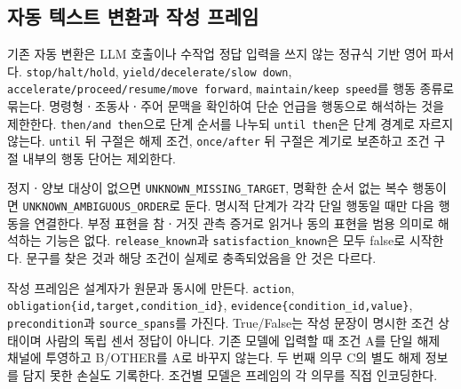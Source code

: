 \section{}
\label{sec:method}

\begin{revision}

\subsection{자동 텍스트 변환과 작성 프레임}
\label{sec:extraction}
기존 자동 변환은 LLM 호출이나 수작업 정답 입력을 쓰지 않는 정규식 기반 영어 파서다. \texttt{stop/halt/hold}, \texttt{yield/decelerate/slow down}, \texttt{accelerate/proceed/resume/move forward}, \texttt{maintain/keep speed}를 행동 종류로 묶는다. 명령형ㆍ조동사ㆍ주어 문맥을 확인하여 단순 언급을 행동으로 해석하는 것을 제한한다. \texttt{then/and then}으로 단계 순서를 나누되 \texttt{until then}은 단계 경계로 자르지 않는다. \texttt{until} 뒤 구절은 해제 조건, \texttt{once/after} 뒤 구절은 계기로 보존하고 조건 구절 내부의 행동 단어는 제외한다.

정지ㆍ양보 대상이 없으면 \texttt{UNKNOWN\_MISSING\_TARGET}, 명확한 순서 없는 복수 행동이면 \texttt{UNKNOWN\_AMBIGUOUS\_ORDER}로 둔다. 명시적 단계가 각각 단일 행동일 때만 다음 행동을 연결한다. 부정 표현을 참ㆍ거짓 관측 증거로 읽거나 동의 표현을 범용 의미로 해석하는 기능은 없다. \texttt{release\_known}과 \texttt{satisfaction\_known}은 모두 false로 시작한다. 문구를 찾은 것과 해당 조건이 실제로 충족되었음을 안 것은 다르다.

작성 프레임은 설계자가 원문과 동시에 만든다. \texttt{action}, \texttt{obligation\{id,target,condition\_id\}}, \texttt{evidence\{condition\_id,value\}}, \texttt{precondition}과 \texttt{source\_spans}를 가진다. True/False는 작성 문장이 명시한 조건 상태이며 사람의 독립 센서 정답이 아니다. 기존 모델에 입력할 때 조건 A를 단일 해제 채널에 투영하고 B/OTHER를 A로 바꾸지 않는다. 두 번째 의무 C의 별도 해제 정보를 담지 못한 손실도 기록한다. 조건별 모델은 프레임의 각 의무를 직접 인코딩한다.


\end{revision}
